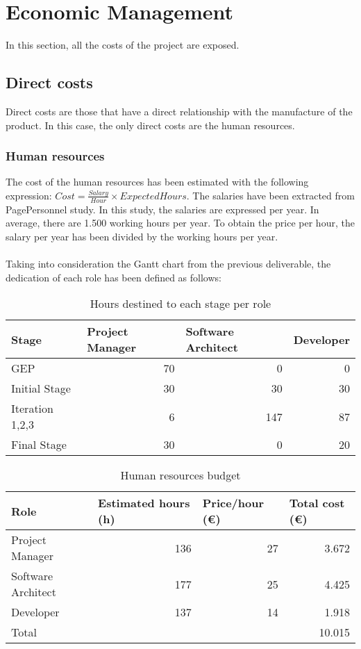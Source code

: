 \chapter{Economic Management}
\label{Chapter7}

In this section, all the costs of the project are exposed. 
\section{Direct costs}
Direct costs are those that have a direct relationship with the manufacture of the product. In this case, the only direct costs are the human resources. 

\subsection{Human resources}
The cost of the human resources has been estimated with the following expression: $Cost = \frac{Salary}{Hour} \times Expected Hours$. The salaries have been extracted from PagePersonnel study\cite{PagePersonnel}. In this study, the salaries are expressed per year. In average, there are 1.500 working hours per year. To obtain the price per hour, the salary per year has been divided by the working hours per year.\\\\
Taking into consideration the Gantt chart from the previous deliverable, the dedication of each role has been defined as follows:

\begin{table}[h!]
	\centering
	\begin{tabular}{|l|r|r|r|}
		\hline
		Stage & \multicolumn{1}{l|}{Project Manager} & \multicolumn{1}{l|}{Software Architect} & \multicolumn{1}{l|}{Developer} \\ \hline
		GEP & 70 & 0 & 0 \\ \hline
		Initial Stage & 30 & 30 & 30 \\ \hline
		Iteration 1,2,3 & 6 & 147 & 87 \\ \hline
		Final Stage & 30 & 0 & 20 \\ \hline
	\end{tabular}
	\caption{Hours destined to each stage per role}
	\label{StageResources}
\end{table}
\begin{table}[h!]
	\centering
	\begin{tabular}{|l|r|r|r|}
		\hline
		Role & \multicolumn{1}{l|}{Estimated hours (h)} & \multicolumn{1}{l|}{Price/hour (€)} & \multicolumn{1}{l|}{Total cost (€)} \\ \hline
		Project Manager & 136 & 27  & 3.672 \\ \hline
		Software Architect & 177 & 25 & 4.425 \\ \hline
		Developer & 137 & 14 & 1.918 \\ \hline\hline
		Total & \multicolumn{3}{r|}{10.015} \\ \hline
	\end{tabular}
	\caption{Human resources budget}
	\label{HumanResources}
\end{table}


